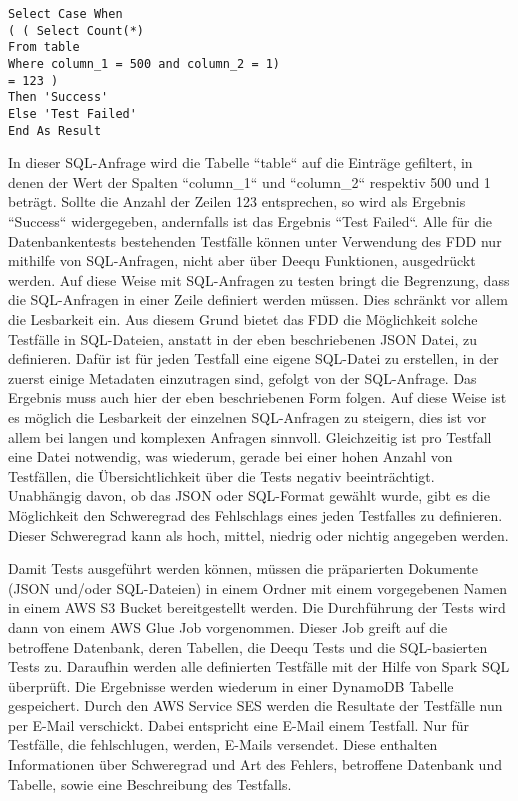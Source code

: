 \begin{lstlisting}[basicstyle=\scriptsize, caption={\texttt{Beispiel einer SQL-Anfrage im \ac{FDD}}},captionpos=b]
Select Case When 
( ( Select Count(*) 
From table 
Where column_1 = 500 and column_2 = 1) 
= 123 ) 
Then 'Success' 
Else 'Test Failed' 
End As Result
\end{lstlisting}

In dieser \ac{SQL}-Anfrage wird die Tabelle ``table`` auf die Einträge gefiltert, in denen der Wert der Spalten ``column\_1`` und ``column\_2`` respektiv 500 und 1 beträgt. Sollte die Anzahl der Zeilen 123 entsprechen, so wird als Ergebnis ``Success`` widergegeben, andernfalls ist das Ergebnis ``Test Failed``.
Alle für die Datenbankentests bestehenden Testfälle können unter Verwendung des \ac{FDD} nur mithilfe von \ac{SQL}-Anfragen, nicht aber über Deequ Funktionen, ausgedrückt werden.
\newline
Auf diese Weise mit \ac{SQL}-Anfragen zu testen bringt die Begrenzung, dass die \ac{SQL}-Anfragen in einer Zeile definiert werden müssen. Dies schränkt vor allem die Lesbarkeit ein. Aus diesem Grund bietet das \ac{FDD}  die Möglichkeit solche Testfälle in \ac{SQL}-Dateien, anstatt in der eben beschriebenen \ac{JSON} Datei, zu definieren. Dafür ist für jeden Testfall eine eigene \ac{SQL}-Datei zu erstellen, in der zuerst einige Metadaten einzutragen sind, gefolgt von der \ac{SQL}-Anfrage. Das Ergebnis muss auch hier der eben beschriebenen Form folgen. Auf diese Weise ist es möglich die Lesbarkeit der einzelnen \ac{SQL}-Anfragen zu steigern, dies ist vor allem bei langen und komplexen Anfragen sinnvoll. Gleichzeitig ist pro Testfall eine Datei notwendig, was wiederum, gerade bei einer hohen Anzahl von Testfällen, die Übersichtlichkeit über die Tests negativ beeinträchtigt.
\newline
Unabhängig davon, ob das \ac{JSON} oder \ac{SQL}-Format gewählt wurde, gibt es die Möglichkeit den Schweregrad des Fehlschlags eines jeden Testfalles zu definieren. Dieser Schweregrad kann als hoch, mittel, niedrig oder nichtig angegeben werden.
\newline


Damit Tests ausgeführt werden können, müssen die präparierten Dokumente (\ac{JSON} und/oder \ac{SQL}-Dateien) in einem Ordner mit einem vorgegebenen Namen in einem AWS \ac{S3} Bucket bereitgestellt werden.  Die Durchführung der Tests wird dann von einem AWS Glue Job vorgenommen. Dieser Job greift auf die betroffene Datenbank, deren Tabellen, die Deequ Tests und die \ac{SQL}-basierten Tests zu. Daraufhin werden alle definierten Testfälle mit der Hilfe von Spark \ac{SQL} überprüft. Die Ergebnisse werden wiederum in einer DynamoDB Tabelle gespeichert. Durch den AWS Service \ac{SES} werden die Resultate der Testfälle nun per E-Mail verschickt. Dabei entspricht eine E-Mail einem Testfall. 
Nur für Testfälle, die fehlschlugen, werden, E-Mails versendet. Diese enthalten Informationen über Schweregrad und Art des Fehlers,  betroffene Datenbank und Tabelle, sowie eine Beschreibung des Testfalls. 
\newline


